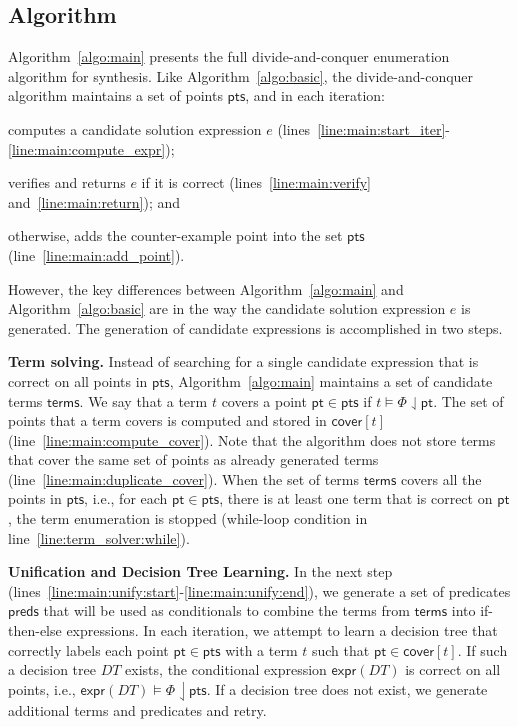 \documentclass{llncs}
\newcommand\Points{\mathsf{pts}}
\newcommand\Point{\mathsf{pt}}
\newcommand\Predicates{\mathsf{preds}}
\newcommand\Expr{e}
\newcommand\Terms{\mathsf{terms}}
\newcommand\Term{t}
\newcommand\Cover{\mathsf{cover}}
\newcommand\Spec{\Phi}
\newcommand\DecisionTree{\mathit{DT}}
\newcommand\DTtoExpr[1]{\mathsf{expr}(#1)}
\renewcommand{\paragraph}[1]{\par\noindent\textbf{#1.}}
\begin{document}
\subsection{Algorithm}
\label{sec:algo:main}

Algorithm~\ref{algo:main} presents the full divide-and-conquer
enumeration algorithm for synthesis.
Like Algorithm~\ref{algo:basic}, the divide-and-conquer algorithm
maintains a set of points $\Points$, and in each iteration:
\begin{inparaenum}[(a)]
\item computes a candidate solution expression $\Expr$
  (lines~\ref{line:main:start_iter}-\ref{line:main:compute_expr});
\item verifies and returns $\Expr$ if it is correct (lines~\ref{line:main:verify}
  and~\ref{line:main:return}); and
\item otherwise, adds the counter-example point into the set $\Points$
  (line~\ref{line:main:add_point}).
\end{inparaenum}

However, the key differences between Algorithm~\ref{algo:main} and
Algorithm~\ref{algo:basic} are in the way the candidate solution
expression $\Expr$ is generated.
The generation of candidate expressions is accomplished in two
steps.

\paragraph{Term solving}
Instead of searching for a single candidate expression that is correct
on all points in $\Points$, Algorithm~\ref{algo:main} maintains a set of
candidate terms $\Terms$.
We say that a term $\Term$ covers a point $\Point \in \Points$ if $\Term
\models \Spec \downharpoonleft \Point$.
The set of points that a term covers is computed and stored in
$\Cover[\Term]$ (line~\ref{line:main:compute_cover}).
Note that the algorithm does not store terms that cover the same set of
points as already generated terms
(line~\ref{line:main:duplicate_cover}).
When the set of terms $\Terms$ covers all the points in $\Points$, i.e., for
each $\Point \in \Points$, there is at least one term that is correct on
$\Point$, the term enumeration is stopped (while-loop condition in
line~\ref{line:term_solver:while}).

\paragraph{Unification and Decision Tree Learning}
In the next step
(lines~\ref{line:main:unify:start}-\ref{line:main:unify:end}), we
generate a set of predicates $\Predicates$ that will be used as
conditionals to combine the terms from $\Terms$ into if-then-else
expressions.
In each iteration, we attempt to learn a decision tree that correctly
labels each point $\Point \in \Points$ with a term $\Term$ such that
$\Point \in \Cover[\Term]$.
If such a decision tree $\DecisionTree$ exists, the conditional
expression $\DTtoExpr{\DecisionTree}$ is correct on all points, i.e.,
$\DTtoExpr{\DecisionTree} \models \Spec \downharpoonleft \Points$.
If a decision tree does not exist, we generate additional terms and
predicates and retry.
\end{document}
